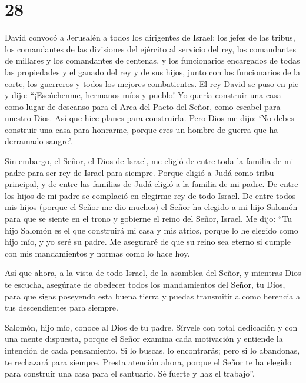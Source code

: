 \hypertarget{section-27}{%
\section{28}\label{section-27}}

 David convocó a Jerusalén a todos los dirigentes de Israel:
los jefes de las tribus, los comandantes de las divisiones del ejército
al servicio del rey, los comandantes de millares y los comandantes de
centenas, y los funcionarios encargados de todas las propiedades y el
ganado del rey y de sus hijos, junto con los funcionarios de la corte,
los guerreros y todos los mejores combatientes.  El rey
David se puso en pie y dijo: ``¡Escúchenme, hermanos míos y pueblo! Yo
quería construir una casa como lugar de descanso para el Arca del Pacto
del Señor, como escabel para nuestro Dios. Así que hice planes para
construirla.  Pero Dios me dijo: `No debes construir una
casa para honrarme, porque eres un hombre de guerra que ha derramado
sangre'.

 Sin embargo, el Señor, el Dios de Israel, me eligió de
entre toda la familia de mi padre para ser rey de Israel para siempre.
Porque eligió a Judá como tribu principal, y de entre las familias de
Judá eligió a la familia de mi padre. De entre los hijos de mi padre se
complació en elegirme rey de todo Israel.  De entre todos
mis hijos (porque el Señor me dio muchos) el Señor ha elegido a mi hijo
Salomón para que se siente en el trono y gobierne el reino del Señor,
Israel.  Me dijo: ``Tu hijo Salomón es el que construirá mi
casa y mis atrios, porque lo he elegido como hijo mío, y yo seré su
padre.  Me aseguraré de que su reino sea eterno si cumple
con mis mandamientos y normas como lo hace hoy.

 Así que ahora, a la vista de todo Israel, de la asamblea
del Señor, y mientras Dios te escucha, asegúrate de obedecer todos los
mandamientos del Señor, tu Dios, para que sigas poseyendo esta buena
tierra y puedas transmitirla como herencia a tus descendientes para
siempre.

 Salomón, hijo mío, conoce al Dios de tu padre. Sírvele con
total dedicación y con una mente dispuesta, porque el Señor examina cada
motivación y entiende la intención de cada pensamiento. Si lo buscas, lo
encontrarás; pero si lo abandonas, te rechazará para siempre.
 Presta atención ahora, porque el Señor te ha elegido para
construir una casa para el santuario. Sé fuerte y haz el trabajo''.


